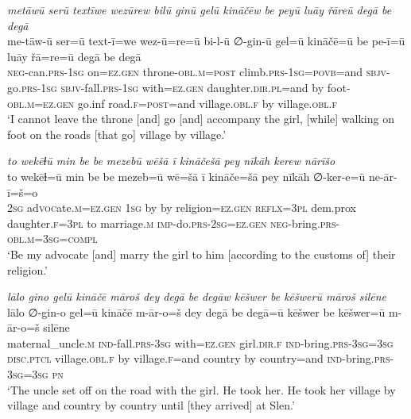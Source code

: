 \ea \label{ŽP.161}
\textit{metāwū serū textīwe wezūrew bilū ginū gelū kināčēw be peyū luāy řāreū degā be degā} \\ 
\gll me-tāw-ū ser=ū text-ī=we wez-ū=re=ū bi-l-ū ∅-gin-ū gel=ū kināčē=ū be pe-ī=ū luāy řā=re=ū degā be degā \\ 
 \textsc{neg-}can\textsc{.prs}\textsc{-\textsc{1sg}} on\textsc{\textsc{=ez.gen}} throne\textsc{-obl}\textsc{.m}\textsc{=\textsc{post}} climb\textsc{.prs}\textsc{-\textsc{1sg}}\textsc{=\textsc{povb}}=and \textsc{sbjv-}go\textsc{.prs}\textsc{-\textsc{1sg}} \textsc{sbjv-}fall\textsc{.prs}\textsc{-\textsc{1sg}} with\textsc{\textsc{=ez.gen}} daughter\textsc{.dir}\textsc{.pl}=and by foot\textsc{-obl}\textsc{.m}\textsc{\textsc{=ez.gen}} go.inf road\textsc{.f}\textsc{=\textsc{post}}=and village\textsc{.obl}\textsc{.f} by village\textsc{.obl}\textsc{.f} \\ 
\glt `I cannot leave the throne [and] go [and] accompany the girl, [while] walking on foot on the roads [that go] village by village.'
\z 
 
\ea \label{ŽP.165}
\textit{to wekēɫū min be be mezebū wēšā ī kināčešā pey nīkāh kerew nārīšo} \\ 
\gll to wekēɫ=ū min be be mezeb=ū wē=šā ī kināče=šā pey nīkāh ∅-ker-e=ū ne-ār-ī=š=o \\ 
 \textsc{2sg} ad\textsc{voc}ate\textsc{.m}\textsc{\textsc{=ez.gen}} \textsc{1sg} by by religion\textsc{\textsc{=ez.gen}} \textsc{reflx}\textsc{=3pl} dem.prox daughter\textsc{.f}\textsc{=3pl} to marriage\textsc{.m} \textsc{imp-}do\textsc{.prs}-\textsc{2sg}\textsc{\textsc{=ez.gen}} \textsc{neg-}bring\textsc{.prs}\textsc{-obl}\textsc{.m}\textsc{=3sg}\textsc{=compl} \\ 
\glt `Be my advocate [and] marry the girl to him [according to the customs of] their religion.'
\z 
 
\ea \label{ŽP.166}
\textit{lālo gino gelū kināčē māroš dey degā be degāw kēšwer be kēšwerū māroš silēne} \\ 
\gll lālo ∅-gin-o gel=ū kināčē m-ār-o=š dey degā be degā=ū kēšwer be kēšwer=ū m-ār-o=š silēne \\ 
 maternal\_uncle\textsc{.m} \textsc{ind-}fall\textsc{.prs}\textsc{-3sg} with\textsc{\textsc{=ez.gen}} girl\textsc{.dir}\textsc{.f} \textsc{ind-}bring\textsc{.prs}\textsc{-3sg}\textsc{=3sg} \textsc{disc.ptcl} village\textsc{.obl}\textsc{.f} by village\textsc{.f}=and country by country=and \textsc{ind-}bring\textsc{.prs}\textsc{-3sg}\textsc{=3sg} \textsc{pn} \\ 
\glt `The uncle set off on the road with the girl. He took her. He took her village by village and country by country until [they arrived] at Slen.'
\z 
 
